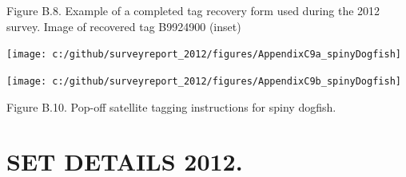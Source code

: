 \documentclass[12pt]{article}\usepackage[]{graphicx}\usepackage[]{color}
\begin{document}
\begin{appendices}
Figure B.8. Example of a completed tag recovery form used during the 2012 survey. Image of recovered tag B9924900 (inset)

\clearpage
\begin{flushleft}\texttt{[image: c:/github/surveyreport\_2012/figures/AppendixC9a\_spinyDogfish]} \end{flushleft}
\begin{flushleft}\texttt{[image: c:/github/surveyreport\_2012/figures/AppendixC9b\_spinyDogfish]} \end{flushleft}

Figure B.10. Pop-off satellite tagging instructions for spiny dogfish.

\clearpage

\section{SET DETAILS 2012.}
\label{app:third-appendix}


\end{appendices}
\end{document}
